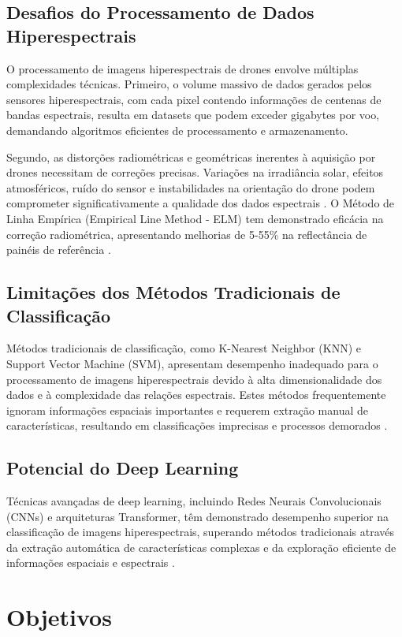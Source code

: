 \subsection{Desafios do Processamento de Dados Hiperespectrais}
O processamento de imagens hiperespectrais de drones envolve múltiplas complexidades técnicas. Primeiro, o volume massivo de dados gerados pelos sensores hiperespectrais, com cada pixel contendo informações de centenas de bandas espectrais, resulta em datasets que podem exceder gigabytes por voo, demandando algoritmos eficientes de processamento e armazenamento.

Segundo, as distorções radiométricas e geométricas inerentes à aquisição por drones necessitam de correções precisas. Variações na irradiância solar, efeitos atmosféricos, ruído do sensor e instabilidades na orientação do drone podem comprometer significativamente a qualidade dos dados espectrais \cite{Shin2024}. O Método de Linha Empírica (Empirical Line Method - ELM) tem demonstrado eficácia na correção radiométrica, apresentando melhorias de 5-55\% na reflectância de painéis de referência \cite{Shin2024}.

\subsection{Limitações dos Métodos Tradicionais de Classificação}
Métodos tradicionais de classificação, como K-Nearest Neighbor (KNN) e Support Vector Machine (SVM), apresentam desempenho inadequado para o processamento de imagens hiperespectrais devido à alta dimensionalidade dos dados e à complexidade das relações espectrais. Estes métodos frequentemente ignoram informações espaciais importantes e requerem extração manual de características, resultando em classificações imprecisas e processos demorados \cite{Lou2024}.

\subsection{Potencial do Deep Learning}
Técnicas avançadas de deep learning, incluindo Redes Neurais Convolucionais (CNNs) e arquiteturas Transformer, têm demonstrado desempenho superior na classificação de imagens hiperespectrais, superando métodos tradicionais através da extração automática de características complexas e da exploração eficiente de informações espaciais e espectrais \cite{Lou2024}.

\section{Objetivos}\label{sec:objetivos}

